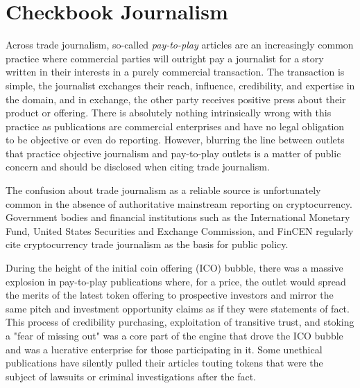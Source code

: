 \section{Checkbook Journalism}

Across trade journalism, so-called \textit{pay-to-play} articles are an
increasingly common practice where commercial parties will outright pay a
journalist for a story written in their interests in a purely commercial
transaction. The transaction is simple, the journalist exchanges their reach,
influence, credibility, and expertise in the domain, and in exchange, the other
party receives positive press about their product or offering. There is
absolutely nothing intrinsically wrong with this practice as publications are
commercial enterprises and have no legal obligation to be objective or even do
reporting.  However, blurring the line between outlets that practice objective
journalism and pay-to-play outlets is a matter of public concern and should be
disclosed when citing trade journalism.


The confusion about trade journalism as a reliable source is unfortunately
common in the absence of authoritative mainstream reporting on cryptocurrency.
Government bodies and financial institutions such as the International Monetary
Fund, United States Securities and Exchange Commission, and FinCEN regularly
cite cryptocurrency trade journalism as the basis for public policy.


During the height of the initial coin offering (ICO) bubble, there was a massive
explosion in pay-to-play publications where, for a price, the outlet would
spread the merits of the latest token offering to prospective investors and
mirror the same pitch and investment opportunity claims as if they were
statements of fact. This process of credibility purchasing, exploitation of
transitive trust, and stoking a "fear of missing out" was a core part of the
engine that drove the ICO bubble and was a lucrative enterprise for those
participating in it. Some unethical publications have silently pulled their
articles touting tokens that were the subject of lawsuits or criminal
investigations after the fact.


